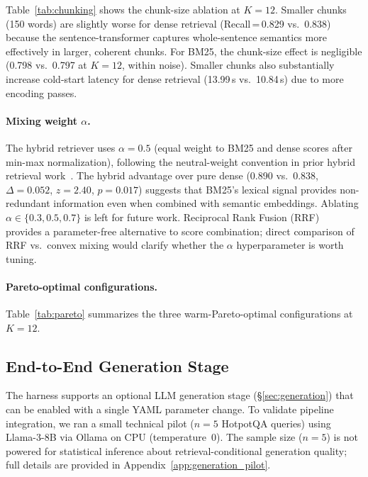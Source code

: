 \documentclass[11pt,a4paper]{article}
\begin{document}


Table~\ref{tab:chunking} shows the chunk-size ablation at $K=12$.
Smaller chunks (150 words) are slightly worse for dense retrieval
(Recall\,=\,0.829 vs.\ 0.838) because the sentence-transformer captures
whole-sentence semantics more effectively in larger, coherent chunks.
For BM25, the chunk-size effect is negligible (0.798 vs.\ 0.797 at $K=12$,
within noise).
Smaller chunks also substantially increase cold-start latency for dense
retrieval (13.99\,s vs.\ 10.84\,s) due to more encoding passes.

\paragraph{Mixing weight $\alpha$.}
The hybrid retriever uses $\alpha = 0.5$ (equal weight to BM25 and dense scores
after min-max normalization), following the neutral-weight convention in prior
hybrid retrieval work~\citep{cormack2009rrf,lin2022aggretriever}.
The hybrid advantage over pure dense (0.890 vs.\ 0.838, $\Delta = 0.052$,
$z = 2.40$, $p = 0.017$) suggests that BM25's lexical signal provides
non-redundant information even when combined with semantic embeddings.
Ablating $\alpha \in \{0.3, 0.5, 0.7\}$ is left for future work.
Reciprocal Rank Fusion (RRF)~\citep{cormack2009rrf} provides a parameter-free
alternative to score combination; direct comparison of RRF vs.\ convex mixing
would clarify whether the $\alpha$ hyperparameter is worth tuning.

\paragraph{Pareto-optimal configurations.}
Table~\ref{tab:pareto} summarizes the three warm-Pareto-optimal configurations
at $K=12$.



\subsection{End-to-End Generation Stage}
\label{sec:results_gen}

The harness supports an optional LLM generation stage (\S\ref{sec:generation})
that can be enabled with a single YAML parameter change.
To validate pipeline integration, we ran a small technical pilot
($n = 5$ HotpotQA queries) using Llama-3-8B via Ollama on CPU
(temperature~0).
The sample size ($n=5$) is not powered for statistical inference about
retrieval-conditional generation quality; full details are provided in
Appendix~\ref{app:generation_pilot}.
\end{document}
